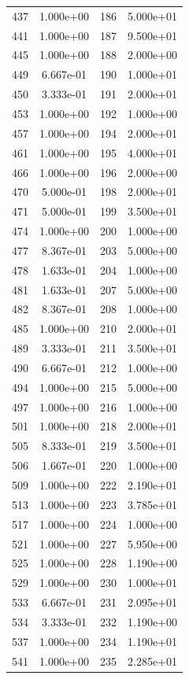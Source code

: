 \documentclass[12pt]{article}
\begin{document}
\begin{longtable}{@{}cccc@{}}
437 & 1.000e+00 & 186 & 5.000e+01 \\
441 & 1.000e+00 & 187 & 9.500e+01 \\
445 & 1.000e+00 & 188 & 2.000e+00 \\
449 & 6.667e-01 & 190 & 1.000e+01 \\
450 & 3.333e-01 & 191 & 2.000e+01 \\
453 & 1.000e+00 & 192 & 1.000e+00 \\
457 & 1.000e+00 & 194 & 2.000e+01 \\
461 & 1.000e+00 & 195 & 4.000e+01 \\
466 & 1.000e+00 & 196 & 2.000e+00 \\
470 & 5.000e-01 & 198 & 2.000e+01 \\
471 & 5.000e-01 & 199 & 3.500e+01 \\
474 & 1.000e+00 & 200 & 1.000e+00 \\
477 & 8.367e-01 & 203 & 5.000e+00 \\
478 & 1.633e-01 & 204 & 1.000e+00 \\
481 & 1.633e-01 & 207 & 5.000e+00 \\
482 & 8.367e-01 & 208 & 1.000e+00 \\
485 & 1.000e+00 & 210 & 2.000e+01 \\
489 & 3.333e-01 & 211 & 3.500e+01 \\
490 & 6.667e-01 & 212 & 1.000e+00 \\
494 & 1.000e+00 & 215 & 5.000e+00 \\
497 & 1.000e+00 & 216 & 1.000e+00 \\
501 & 1.000e+00 & 218 & 2.000e+01 \\
505 & 8.333e-01 & 219 & 3.500e+01 \\
506 & 1.667e-01 & 220 & 1.000e+00 \\
509 & 1.000e+00 & 222 & 2.190e+01 \\
513 & 1.000e+00 & 223 & 3.785e+01 \\
517 & 1.000e+00 & 224 & 1.000e+00 \\
521 & 1.000e+00 & 227 & 5.950e+00 \\
525 & 1.000e+00 & 228 & 1.190e+00 \\
529 & 1.000e+00 & 230 & 1.000e+01 \\
533 & 6.667e-01 & 231 & 2.095e+01 \\
534 & 3.333e-01 & 232 & 1.190e+00 \\
537 & 1.000e+00 & 234 & 1.190e+01 \\
541 & 1.000e+00 & 235 & 2.285e+01 \\

\end{longtable}
\end{document}
